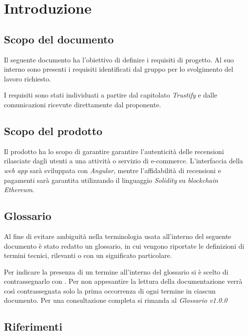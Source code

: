 \section{Introduzione}


\subsection{Scopo del documento}
Il seguente documento ha l'obiettivo di definire i requisiti di progetto. Al suo interno sono presenti i requisiti
identificati dal gruppo \groupName\: per lo svolgimento del lavoro richiesto.

I requisiti sono stati individuati a partire dal capitolato \textit{Trustify}
e dalle comunicazioni ricevute direttamente dal proponente.

\subsection{Scopo del prodotto}
Il prodotto ha lo scopo di garantire garantire l'autenticità
delle recensioni rilasciate dagli utenti a una attività o servizio di e-commerce. L'interfaccia della \textit{web app}\glo \: sarà
sviluppata con \textit{Angular}\glo \:, mentre l'affidabilità di recensioni e pagamenti sarà garantita utilizzando il linguaggio \textit{Solidity}\glo \: su \textit{blockchain}\glo \: \textit{Ethereum}\glo \:.


\subsection{Glossario}
Al fine di evitare ambiguità nella terminologia usata all'interno del seguente
documento è stato redatto un glossario, in cui vengono riportate le definizioni
di termini tecnici, rilevanti o con un significato particolare.

Per indicare
la presenza di un termine all'interno del glossario si è scelto di
contrassegnarlo con \glo . Per non appesantire la lettura della documentazione
verrà così contrassegnata solo la prima occorrenza di ogni termine in ciascun
documento.
Per una consultazione completa si rimanda al \textit{Glossario v1.0.0}

\subsection{Riferimenti}
